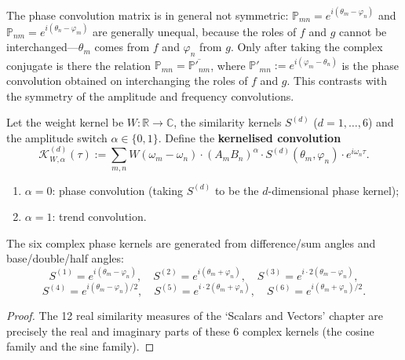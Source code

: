 \begin{remark}\label{rem:phase_convolution_asymmetry}
The phase convolution matrix is in general not symmetric: $\mathbb{P}_{mn} = e^{i(\theta_m - \varphi_n)}$ and $\mathbb{P}_{nm} = e^{i(\theta_n - \varphi_m)}$ are generally unequal, because the roles of $f$ and $g$ cannot be interchanged---$\theta_m$ comes from $f$ and $\varphi_n$ from $g$. Only after taking the complex conjugate is there the relation $\mathbb{P}_{mn} = \overline{\mathbb{P}'_{nm}}$, where $\mathbb{P}'_{mn} := e^{i(\varphi_m - \theta_n)}$ is the phase convolution obtained on interchanging the roles of $f$ and $g$. This contrasts with the symmetry of the amplitude and frequency convolutions.
\end{remark}

\begin{definition}\label{def:kernelized_convolution}
Let the weight kernel be $W: \mathbb{R} \to \mathbb{C}$, the similarity kernels $S^{(d)}$ ($d = 1,\dots,6$) and the amplitude switch $\alpha \in \{0, 1\}$. Define the \textbf{kernelised convolution}
\[
\mathcal{K}^{(d)}_{W,\alpha}(\tau) := \sum_{m,n} W(\omega_m - \omega_n) \cdot (A_m B_n)^{\alpha} \cdot S^{(d)}(\theta_m, \varphi_n) \cdot e^{i\omega_n \tau}.
\]
\begin{enumerate}[label=(\roman*)]
    \item $\alpha = 0$: phase convolution (taking $S^{(d)}$ to be the $d$-dimensional phase kernel);
    \item $\alpha = 1$: trend convolution.
\end{enumerate}
\end{definition}

\begin{proposition}\label{prop:six_complex_kernels}
The six complex phase kernels are generated from difference/sum angles and base/double/half angles:
\[
S^{(1)} = e^{i(\theta_m - \varphi_n)}, \quad S^{(2)} = e^{i(\theta_m + \varphi_n)}, \quad S^{(3)} = e^{i \cdot 2(\theta_m - \varphi_n)},
\]
\[
S^{(4)} = e^{i(\theta_m - \varphi_n)/2}, \quad S^{(5)} = e^{i \cdot 2(\theta_m + \varphi_n)}, \quad S^{(6)} = e^{i(\theta_m + \varphi_n)/2}.
\]
\end{proposition}

\begin{proof}
The 12 real similarity measures of the `Scalars and Vectors' chapter are precisely the real and imaginary parts of these 6 complex kernels (the cosine family and the sine family).
\end{proof}

